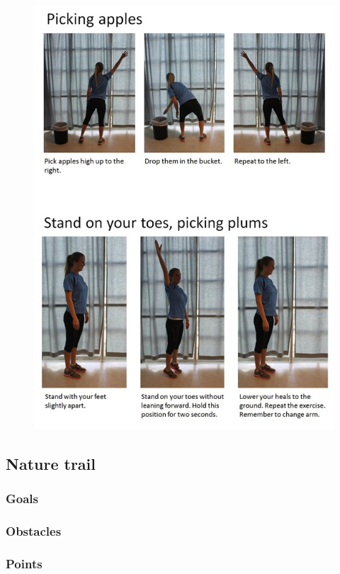 \begin{figure} [ht!]
\centering
\includegraphics[scale=0.7]{PickingApples.jpg}
\label{pickingapples}
\end{figure}

\subsection{Nature trail}



\subsubsection{Goals}
\subsubsection{Obstacles}
\subsubsection{Points}

